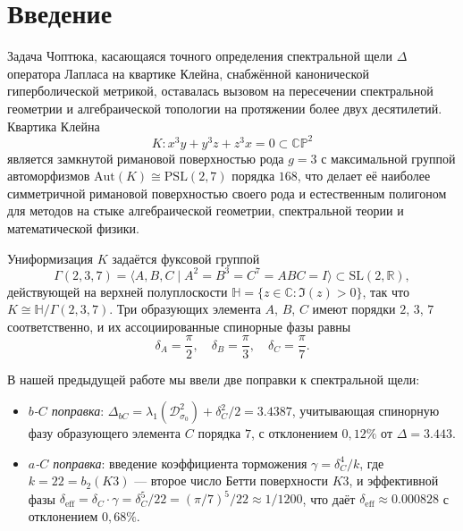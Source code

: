 \documentclass[12pt,a4paper]{article}
\theoremstyle{definition}
\theoremstyle{remark}
\newcommand{\CC}{\mathbb{C}}
\newcommand{\RR}{\mathbb{R}}
\newcommand{\PP}{\mathbb{P}}
\newcommand{\HH}{\mathbb{H}}
\newcommand{\SL}{\mathrm{SL}}
\newcommand{\PSL}{\mathrm{PSL}}
\newcommand{\Aut}{\mathrm{Aut}}
\newcommand{\cD}{\mathcal{D}}
\begin{document}
\tableofcontents

\newpage
\section{Введение}

Задача Чоптюка, касающаяся точного определения спектральной щели $\Delta$ оператора Лапласа на квартике Клейна, снабжённой канонической гиперболической метрикой, оставалась вызовом на пересечении спектральной геометрии и алгебраической топологии на протяжении более двух десятилетий. Квартика Клейна
\begin{equation}
K \colon x^3y + y^3z + z^3x = 0 \subset \CC\PP^2
\end{equation}
является замкнутой римановой поверхностью рода $g = 3$ с максимальной группой автоморфизмов $\Aut(K) \cong \PSL(2,7)$ порядка $168$, что делает её наиболее симметричной римановой поверхностью своего рода и естественным полигоном для методов на стыке алгебраической геометрии, спектральной теории и математической физики.

Униформизация $K$ задаётся фуксовой группой
\begin{equation}
\Gamma(2,3,7) = \langle A, B, C \mid A^2 = B^3 = C^7 = ABC = I \rangle \subset \SL(2,\RR),
\end{equation}
действующей на верхней полуплоскости $\HH = \{z \in \CC : \Im(z) > 0\}$, так что $K \cong \HH/\Gamma(2,3,7)$. Три образующих элемента $A$, $B$, $C$ имеют порядки $2$, $3$, $7$ соответственно, и их ассоциированные спинорные фазы равны
\begin{equation}
\delta_A = \frac{\pi}{2}, \quad \delta_B = \frac{\pi}{3}, \quad \delta_C = \frac{\pi}{7}.
\end{equation}

В нашей предыдущей работе \cite{Choptyuk2025} мы ввели две поправки к спектральной щели:
\begin{itemize}
\item \emph{$b$-$C$ поправка}: $\Delta_{bC} = \lambda_1(\cD^2_{\sigma_0}) + \delta_C^2/2 = 3.4387$, учитывающая спинорную фазу образующего элемента $C$ порядка $7$, с отклонением $0{,}12\%$ от $\Delta = 3.443$.
\item \emph{$a$-$C$ поправка}: введение коэффициента торможения $\gamma = \delta_C^4/k$, где $k = 22 = b_2(K3)$ --- второе число Бетти поверхности $K3$, и эффективной фазы $\delta_{\mathrm{eff}} = \delta_C \cdot \gamma = \delta_C^5/22 = (\pi/7)^5/22 \approx 1/1200$, что даёт $\delta_{\mathrm{eff}} \approx 0.000828$ с отклонением $0{,}68\%$.
\end{itemize}
\end{document}
